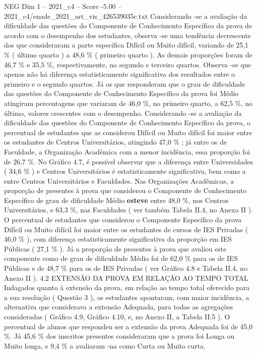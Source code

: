 \begin{textsample}{NEG Dim 1 – 2021\_c4 – Score -5.00 – 2021\_c4/enade\_2021\_art\_vis\_426539035c.txt}
Considerando -se a avaliação da dificuldade das questões do Componente de Conhecimento Específico da prova de acordo com o desempenho dos estudantes, observa -se uma tendência decrescente dos que consideraram a parte específica Difícil ou Muito difícil, variando de 25,1 \% ( último quarto ) a 48,6 \% ( primeiro quarto ).
As demais proporções foram de 46,7 \% e 35,5 \%, respectivamente, no segundo e terceiro quartos.
Observa -se que apenas não há diferença estatisticamente significativa dos resultados entre o primeiro e o segundo quartos.
Já os que responderam que o grau de dificuldade das questões do Componente de Conhecimento Específico da prova foi Médio atingiram percentagens que variaram de 46,0 \%, no primeiro quarto, a 62,5 \%, no último, valores crescentes com o desempenho.
Considerando -se a avaliação da dificuldade das questões do Componente de Conhecimento Específico da prova, o percentual de estudantes que as considerou Difícil ou Muito difícil foi maior entre os estudantes de Centros Universitários, atingindo 47,0 \% ; já entre os de Faculdade, a Organização Acadêmica com a menor incidência, essa proporção foi de 26,7 \%.
No Gráfico 4.7, é possível observar que a diferença entre Universidades ( 34,6 \% ) e Centros Universitários é estatisticamente significativa, bem como a entre Centros Universitários e Faculdades.
Nas Organizações Acadêmicas, a proporção de presentes à prova que considerou o Componente de Conhecimento Específico de grau de dificuldade Médio \textbf{esteve} entre 48,0 \%, nos Centros Universitários, e 63,3 \%, nas Faculdades ( ver também Tabela II.4, no Anexo II ).
O percentual de estudantes que considerou o Componente Específico da prova Difícil ou Muito difícil foi maior entre os estudantes de cursos de IES Privadas ( 46,0 \% ), com diferença estatisticamente significativa da proporção em IES Públicas ( 27,1 \% ).
Já a proporção de presentes à prova que avaliou este componente como de grau de dificuldade Médio foi de 62,0 \% para os de IES Públicas e de 48,7 \% para os de IES Privadas ( ver Gráfico 4.8 e Tabela II.4, no Anexo II ). 4.2 EXTENSÃO DA PROVA EM RELAÇÃO AO TEMPO TOTAL Indagados quanto à extensão da prova, em relação ao tempo total oferecido para a sua resolução ( Questão 3 ), os estudantes apontaram, com maior incidência, a alternativa que considerava a extensão Adequada, para todas as agregações consideradas ( Gráfico 4.9, Gráfico 4.10, e, no Anexo II, a Tabela II.5 ).
O percentual de alunos que respondeu ser a extensão da prova Adequada foi de 45,0 \%.
Já 45,6 \% dos inscritos presentes consideraram que a prova foi Longa ou Muito longa, e 9,4 \% a avaliaram -na como Curta ou Muito curta.

\end{textsample}
